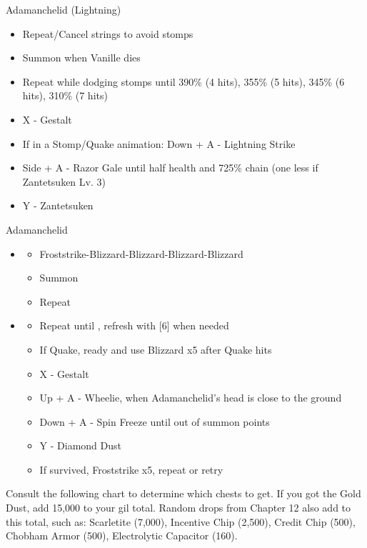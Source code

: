 \begin{paracol}{2}
\begin{battle}{Adamanchelid (Lightning)}
\begin{itemize}
\begin{itemize}
			      \item Repeat/Cancel strings to avoid stomps
			      \item Summon when Vanille dies
			      \item Repeat while dodging stomps until 390\% (4 hits), 355\% (5 hits), 345\% (6 hits), 310\% (7 hits)
			      \item X - Gestalt
			      \item If in a Stomp/Quake animation: Down + A - Lightning Strike
			      \item Side + A - Razor Gale until half health and 725\% chain (one less if Zantetsuken Lv. 3)
			      \item Y - Zantetsuken
		      \end{itemize}
	\end{itemize}
\end{battle}
\switchcolumn
\begin{battle}{Adamanchelid}
\begin{itemize}
    \item \sixth
    \begin{itemize}
        \item Froststrike-Blizzard-Blizzard-Blizzard-Blizzard
        \item Summon
        \item Repeat
    \end{itemize}
    \item \fifth
    \begin{itemize}
        \item Repeat until \stagger, refresh with [6] when needed
        \item If Quake, ready and use Blizzard x5 after Quake hits
        \item X - Gestalt
        \item Up + A - Wheelie, when Adamanchelid's head is close to the ground
        \item Down + A - Spin Freeze until out of summon points
        \item Y - Diamond Dust
        \item If survived, Froststrike x5, repeat or retry
    \end{itemize}
\end{itemize}
\end{battle}
\switchcolumn*
Consult the following chart to determine which chests to get. If you got the Gold Dust, add 15,000 to your gil total. Random drops from Chapter 12 also add to this total, such as: Scarletite (7,000), Incentive Chip (2,500), Credit Chip (500), Chobham Armor (500), Electrolytic Capacitor (160).


\end{paracol}
